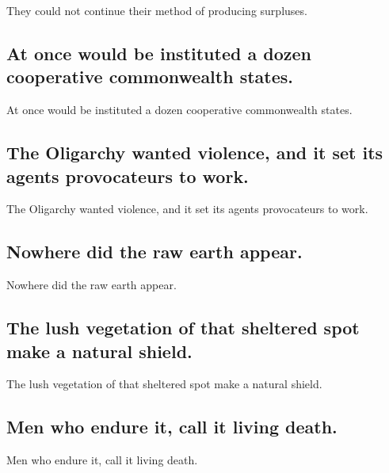 \documentclass[]{article}
\begin{document}
They could not continue their method of producing surpluses.

\hypertarget{at-once-would-be-instituted-a-dozen-cooperative-commonwealth-states.}{%
\subsection{At once would be instituted a dozen cooperative commonwealth
states.}\label{at-once-would-be-instituted-a-dozen-cooperative-commonwealth-states.}}

At once would be instituted a dozen cooperative commonwealth states.

\hypertarget{the-oligarchy-wanted-violence-and-it-set-its-agents-provocateurs-to-work.}{%
\subsection{The Oligarchy wanted violence, and it set its agents
provocateurs to
work.}\label{the-oligarchy-wanted-violence-and-it-set-its-agents-provocateurs-to-work.}}

The Oligarchy wanted violence, and it set its agents provocateurs to
work.

\hypertarget{nowhere-did-the-raw-earth-appear.}{%
\subsection{Nowhere did the raw earth
appear.}\label{nowhere-did-the-raw-earth-appear.}}

Nowhere did the raw earth appear.

\hypertarget{the-lush-vegetation-of-that-sheltered-spot-make-a-natural-shield.}{%
\subsection{The lush vegetation of that sheltered spot make a natural
shield.}\label{the-lush-vegetation-of-that-sheltered-spot-make-a-natural-shield.}}

The lush vegetation of that sheltered spot make a natural shield.

\hypertarget{men-who-endure-it-call-it-living-death.}{%
\subsection{Men who endure it, call it living
death.}\label{men-who-endure-it-call-it-living-death.}}

Men who endure it, call it living death.
\end{document}
